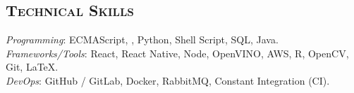 \begin{resume}

\section{\textsc{Technical Skills}}

\emph{Programming}: ECMAScript, \Cplusplus, Python, Shell Script, SQL, Java.\vspace{0.4em}\\
\emph{Frameworks/Tools}: React, React Native, Node, OpenVINO, AWS, R, OpenCV, Git, \LaTeX.\vspace{0.4em}\\
\emph{DevOps}: GitHub / GitLab, Docker, RabbitMQ, Constant Integration (CI).

\end{resume}

